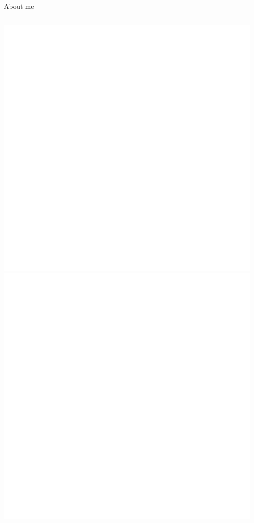 \documentclass[cjk,dvipdfmx,14pt,compress,fragile]{beamer}
\begin{document}
\begin{frame}{About me}
\begin{columns}[c]
\begin{column}{.25\linewidth}
      \includegraphics[width=\textwidth]{image201701/blank.png}
      \\
      \includegraphics[width=\textwidth]{image201701/blank.png}
    \end{column}
  \end{columns}
\end{frame}
\end{document}
